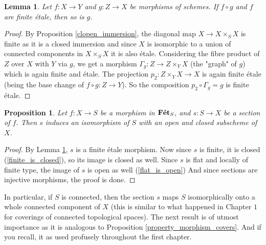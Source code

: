 \documentclass{article}
\theoremstyle{plain}
\newtheorem{proposition}[theorem]{Proposition}
\newtheorem{lemma}[theorem]{Lemma}
\theoremstyle{definition}
\DeclareMathOperator{\Fet}{\bf{F\acute{e}t}}
\begin{document}
\begin{lemma}
\label{etale_between_composition}
    Let $f:X\rightarrow Y$ and $g:Z\rightarrow X$ be morphisms of schemes. If $f\circ g$ and $f$ are finite \'etale, then so is $g$.
\end{lemma}
\begin{proof}
    By Proposition \ref{clopen_immersion}, the diagonal map $X\rightarrow X\times_S X$ is finite as it is a closed immersion and since $X$ is isomorphic to a union of connected components in $X\times_SX$ it is also \'etale.
    Considering the fibre product of $Z$ over $X$ with $Y$ via $g$, we get a morphism $\Gamma_g : Z\rightarrow Z\times_YX$ (the "graph" of $g$) which is again finite and \'etale.
    The projection $p_2:Z\times_YX \rightarrow X$ is again finite \'etale (being the base change of $f\circ g:Z\rightarrow Y$).
    So the composition $p_2\circ\Gamma_g = g$ is finite \'etale.
\end{proof}



\begin{proposition}
\label{sections_etale_cover}
    Let $f:X\rightarrow S$ be a morphism in $\Fet_S$, and $s: S\rightarrow X$ be a section of $f$.
    Then $s$ induces an isomorphism of $S$ with an open and closed subscheme of $X$.
\end{proposition}
\begin{proof}
    By Lemma \ref{etale_between_composition}, $s$ is a finite \'etale morphism. 
    Now since $s$ is finite, it is closed (\ref{finite_is_closed}), so its image is closed as well. Since $s$ is flat and locally of finite type, the image of $s$ is open as well (\ref{flat_is_open})
    And since sections are injective morphisms, the proof is done.
\end{proof}

\noindent In particular, if $S$ is connected, then the section $s$ maps $S$ isomorphically onto a whole connected component of $X$ (this is similar to what happened in Chapter $1$ for coverings of connected topological spaces).
The next result is of utmost importance as it is analogous to Proposition \ref{property_morphism_covers}.
And if you recall, it as used profusely throughout the first chapter. 
\end{document}
